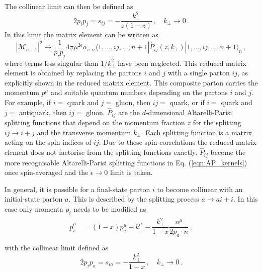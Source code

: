 \documentclass[main.tex]{subfiles}
\begin{document}
    The collinear limit can then be defined as
    \begin{equation}\label{eqn:F_collinear limit}
        2 p_{i} p_{j} = s_{ij} = - \dfrac{k_{\perp}^{2}}{z(1-z)} \, , \quad k_{\perp} \rightarrow 0 \, .
    \end{equation}
    In this limit the matrix element can be written as
    \begin{equation}\label{eqn:F_collinear_factorisation}
        |\mathcal{M}_{n+1}|^{2} \rightarrow \dfrac{1}{p_{i}p_{j}}4\pi \mu^{2\epsilon}\alpha_{s} \; {}_{n} \langle 1, \ldots, ij, \ldots, n+1 | \hat{P}_{ij}(z, k_{\perp}) | 1, \ldots, ij, \ldots, n+1 \rangle_{n} \, ,
    \end{equation}
    where terms less singular than $1 / k_{\perp}^{2}$ have been neglected.
    This reduced matrix element is obtained by replacing the partons
    $i$ and $j$ with a single parton $ij$, as explicitly shown in the reduced
    matrix element. This composite parton carries the
    momentum $p^{\mu}$ and suitable quantum numbers depending
    on the partons $i$ and $j$. For example, if $i =$ quark and $j=$ gluon,
    then $ij =$ quark, or if $i=$ quark and $j =$ antiquark, then $ij =$ gluon.
    $\hat{P}_{ij}$ are the $d$-dimensional Altarelli-Parisi splitting
    functions that depend on the momentum fraction $z$ for the splitting
    $ij \rightarrow i + j$ and the transverse momentum $k_{\perp}$.
    Each splitting function is a matrix acting on the spin indices of $ij$.
    Due to these spin correlations the reduced matrix
    element does not factorise from the splitting functions exactly.
    $\hat{P}_{ij}$ become the more recognisable Altarelli-Parisi
    splitting functions in Eq. (\ref{eqn:AP_kernels}) once spin-averaged
    and the $\epsilon \rightarrow 0$ limit is taken.

    In general, it is possible for a final-state
    parton $i$ to become collinear with an initial-state parton $a$.
    This is described by the splitting process $a \rightarrow ai + i$.
    In this case only momenta $p_{i}$ needs to be modified as
    \begin{align}\label{eqn:I_collinear_momenta}
        \begin{split}
        p_{i}^{\mu} &= (1-x)p_{a}^{\mu} + k_{\perp}^{\mu} - \dfrac{k_{\perp}^{2}}{1-x}\dfrac{n^{\mu}}{2p_{a} \cdot n} \, , \\
        \end{split}
    \end{align}
    with the collinear limit defined as
    \begin{equation}\label{eqn:I_collinear_limit}
        2p_{i}p_{a} = s_{ia} = -\dfrac{k_{\perp}^{2}}{1-x} \, , \quad k_{\perp} \rightarrow 0 \, .
    \end{equation}
\end{document}
